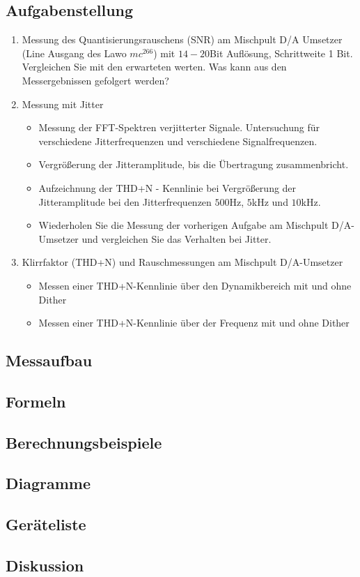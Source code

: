 \documentclass[12pt,a4paper,ngerman]{article}
\begin{document}
\subsection{Aufgabenstellung}
\begin{enumerate}
\item Messung des Quantisierungsrauschens (SNR) am Mischpult D/A Umsetzer (Line Ausgang des Lawo $mc^266$) mit $14-20$Bit Auflösung, Schrittweite 1 Bit. Vergleichen Sie mit den erwarteten werten. Was kann aus den Messergebnissen gefolgert werden?
\item Messung mit Jitter \begin{itemize}
\item Messung der FFT-Spektren verjitterter Signale. Untersuchung für verschiedene Jitterfrequenzen und verschiedene Signalfrequenzen.
\item Vergrößerung der Jitteramplitude, bis die Übertragung zusammenbricht.
\item Aufzeichnung der THD+N - Kennlinie bei Vergrößerung der Jitteramplitude bei den Jitterfrequenzen $500$Hz, $5$kHz und $10$kHz. 
\item Wiederholen Sie die Messung der vorherigen Aufgabe am Mischpult D/A-Umsetzer und vergleichen Sie das Verhalten bei Jitter. 
\end{itemize}
\item Klirrfaktor (THD+N) und Rauschmessungen am Mischpult D/A-Umsetzer
\begin{itemize}
\item Messen einer THD+N-Kennlinie über den Dynamikbereich mit und ohne Dither
\item Messen einer THD+N-Kennlinie über der Frequenz mit und ohne Dither
\end{itemize}
\end{enumerate}
\subsection{Messaufbau}

\subsection{Formeln}

\subsection{Berechnungsbeispiele}

\subsection{Diagramme}

\subsection{Geräteliste}

\subsection{Diskussion}

   
\end{document}
